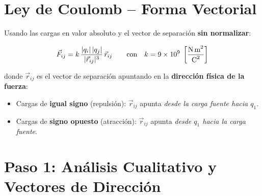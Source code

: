 \documentclass[12pt,letterpaper]{article}
\begin{document}
\begin{center}
\end{center}

\section*{Ley de Coulomb -- Forma Vectorial}

Usando las cargas en valor absoluto y el vector de separaci\'on \textbf{sin normalizar}:

\begin{equation*}
\vec{F}_{ij} = k\,\frac{|q_i|\,|q_j|}{|\vec{r}_{ij}|^3}\,\vec{r}_{ij}
\qquad \text{con} \quad k = 9\times10^9\;\left[\frac{\text{N\,m}^2}{\text{C}^2}\right]
\end{equation*}

donde $\vec{r}_{ij}$ es el vector de separaci\'on apuntando en la \textbf{direcci\'on f\'isica de la fuerza}:
\begin{itemize}
    \item Cargas de \textbf{igual signo} (repulsi\'on): $\vec{r}_{ij}$ apunta \emph{desde la carga fuente hacia $q_1$}.
    \item Cargas de \textbf{signo opuesto} (atracci\'on): $\vec{r}_{ij}$ apunta \emph{desde $q_1$ hacia la carga fuente}.
\end{itemize}

\section*{Paso 1: An\'alisis Cualitativo y Vectores de Direcci\'on}
\end{document}
